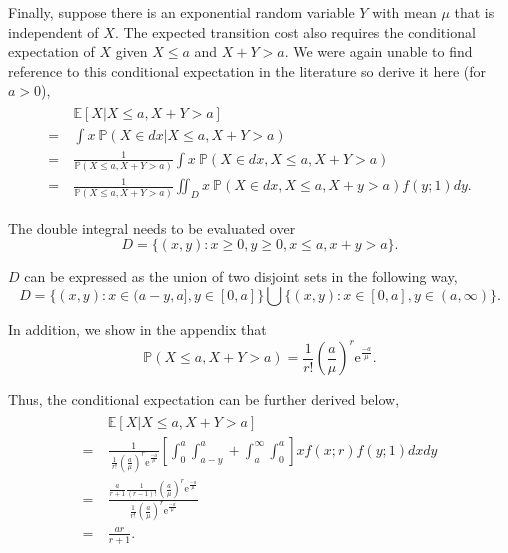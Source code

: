 Finally, suppose there is an exponential random variable $Y$ with mean $\mu$ that is independent of $X$. The expected transition cost also requires the conditional expectation of $X$ given $X \leq a$ and $X + Y > a$. We were again unable to find reference to this conditional expectation in the literature so derive it here (for $a > 0$),
\begin{align}
	\begin{split}
		& \ \mathbb{E} [X | X \leq a, X + Y > a] \\
		= & \ \int x \ \mathbb{P} (X \in d x | X \leq a, X + Y > a) \\
		= & \ \frac{1}{\mathbb{P} (X \leq a, X + Y > a)} \int x \ \mathbb{P} (X \in d x, X \leq a, X + Y > a) \\
		= & \ \frac{1}{\mathbb{P} (X \leq a, X + Y > a)} \iint_{D} x \ \mathbb{P} (X \in d x, X \leq a, X + y > a) f (y; 1) d y.
	\end{split}
\end{align}

The double integral needs to be evaluated over
\begin{equation}
	D = \Big\{ (x, y) : x \geq 0, y \geq 0, x \leq a, x + y > a \Big\}.
\end{equation}

$D$ can be expressed as the union of two disjoint sets in the following way,
\begin{equation}
	D = \Big\{ (x, y) : x \in (a - y, a], y \in [0, a] \Big\} \bigcup \Big\{ (x, y) : x \in [0, a], y \in (a, \infty) \Big\}.
\end{equation}

In addition, we show in the appendix that
\begin{equation}
	\mathbb{P} (X \leq a, X + Y > a) = \frac{1}{r!} \left( \frac{a}{\mu} \right)^{r} \mathrm{e}^{\frac{-a}{\mu}}.
\end{equation}

Thus, the conditional expectation can be further derived below,
\begin{align}
	\begin{split}
		& \ \mathbb{E} [X | X \leq a, X + Y > a] \\
		= & \ \frac{1}{\ \frac{1}{r!} \left( \frac{a}{\mu} \right)^{r} \mathrm{e}^{\frac{-a}{\mu}}} \left[ \int_{0}^{a} \int_{a - y}^{a} + \int_{a}^{\infty} \int_{0}^{a} \right] x f (x; r) f (y; 1) d x d y \\
		= & \ \frac{\frac{a}{r + 1} \frac{1}{(r - 1)!} \left( \frac{a}{\mu} \right)^{r} \mathrm{e}^{\frac{-a}{\mu}}}{\frac{1}{r!} \left( \frac{a}{\mu} \right)^{r} \mathrm{e}^{\frac{-a}{\mu}}} \\
		= & \ \frac{a r}{r + 1}.
	\end{split}
\end{align}

